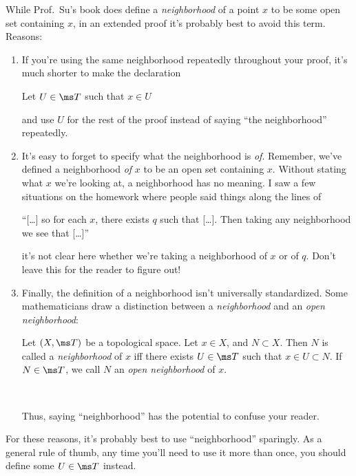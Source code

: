 \documentclass{fkpset}
\begin{document}
\begin{problem}[A2]
  While Prof.\ Su's book does define a \emph{neighborhood} of a point $x$ to be
  some open set containing $x$, in an extended proof it's probably best to avoid
  this term. Reasons:
  \begin{enumerate}
    \item If you're using the same neighborhood repeatedly throughout your
      proof, it's much shorter to make the declaration
      \begin{leftbar}
        Let $U \in \ms T$ such that $x \in U$
      \end{leftbar}
      and use $U$ for the rest of the proof instead of saying ``the
      neighborhood'' repeatedly.
    \item It's easy to forget to specify what the neighborhood is \emph{of}.
      Remember, we've defined a neighborhood \emph{of} $x$ to be an open set
      containing $x$. Without stating what $x$ we're looking at, a neighborhood
      has no meaning. I saw a few situations on the homework where people said
      things along the lines of
      \begin{leftbar}
        ``[\ldots] so for each $x$, there exists $q$ such that [\ldots]. Then
        taking any neighborhood we see that [\ldots]''
      \end{leftbar}
      it's not clear here whether we're taking a neighborhood of $x$ or of $q$.
      Don't leave this for the reader to figure out!
    \item Finally, the definition of a neighborhood isn't universally
      standardized. Some mathematicians draw a distinction between a
      \emph{neighborhood} and an \emph{open neighborhood}:\\
      \begin{definition}
        Let $(X,\ms T)$ be a topological space. Let $x \in X$, and $N \subset
        X$. Then $N$ is called a \emph{neighborhood} of $x$ iff there exists $U
        \in \ms T$ such that $x \in U \subset N$. If $N \in \ms T$, we call $N$
        an \emph{open neighborhood} of $x$.
      \end{definition}~

      Thus, saying ``neighborhood'' has the potential to confuse your reader.
  \end{enumerate}
  For these reasons, it's probably best to use ``neighborhood'' sparingly. As a
  general rule of thumb, any time you'll need to use it more than once, you
  should define some $U \in \ms T$ instead.
\end{problem}
\end{document}
